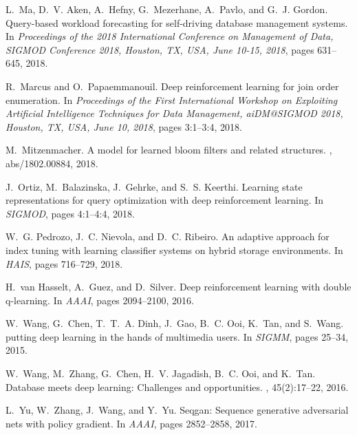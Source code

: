 \documentclass[11pt]{article}
\begin{document}
\begin{thebibliography}{10}
L.~Ma, D.~V. Aken, A.~Hefny, G.~Mezerhane, A.~Pavlo, and G.~J. Gordon.
\newblock Query-based workload forecasting for self-driving database management
  systems.
\newblock In {\em Proceedings of the 2018 International Conference on
  Management of Data, {SIGMOD} Conference 2018, Houston, TX, USA, June 10-15,
  2018}, pages 631--645, 2018.

R.~Marcus and O.~Papaemmanouil.
\newblock Deep reinforcement learning for join order enumeration.
\newblock In {\em Proceedings of the First International Workshop on Exploiting
  Artificial Intelligence Techniques for Data Management, aiDM@SIGMOD 2018,
  Houston, TX, USA, June 10, 2018}, pages 3:1--3:4, 2018.

M.~Mitzenmacher.
\newblock A model for learned bloom filters and related structures.
, abs/1802.00884, 2018.

J.~Ortiz, M.~Balazinska, J.~Gehrke, and S.~S. Keerthi.
\newblock Learning state representations for query optimization with deep
  reinforcement learning.
\newblock In {\em SIGMOD}, pages 4:1--4:4, 2018.

W.~G. Pedrozo, J.~C. Nievola, and D.~C. Ribeiro.
\newblock An adaptive approach for index tuning with learning classifier
  systems on hybrid storage environments.
\newblock In {\em HAIS}, pages 716--729, 2018.

H.~van Hasselt, A.~Guez, and D.~Silver.
\newblock Deep reinforcement learning with double q-learning.
\newblock In {\em AAAI}, pages 2094--2100, 2016.

W.~Wang, G.~Chen, T.~T.~A. Dinh, J.~Gao, B.~C. Ooi, K.~Tan, and S.~Wang.
 putting deep learning in the hands of multimedia users.
\newblock In {\em SIGMM}, pages 25--34, 2015.

W.~Wang, M.~Zhang, G.~Chen, H.~V. Jagadish, B.~C. Ooi, and K.~Tan.
\newblock Database meets deep learning: Challenges and opportunities.
, 45(2):17--22, 2016.

L.~Yu, W.~Zhang, J.~Wang, and Y.~Yu.
\newblock Seqgan: Sequence generative adversarial nets with policy gradient.
\newblock In {\em AAAI}, pages 2852--2858, 2017.


\end{thebibliography}
\end{document}
